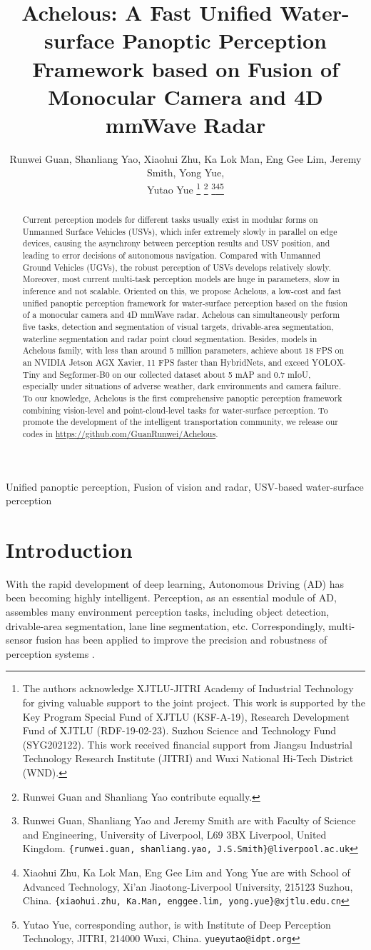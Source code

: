 \documentclass[letterpaper, 10 pt, conference]{ieeeconf}
\title{Achelous: A Fast Unified Water-surface Panoptic Perception Framework based on Fusion of Monocular Camera and 4D mmWave Radar}
\author{Runwei Guan, Shanliang Yao, Xiaohui Zhu, Ka Lok Man, Eng Gee Lim, Jeremy Smith,  Yong Yue, \\ Yutao Yue
\thanks{The authors acknowledge XJTLU-JITRI Academy of Industrial Technology for giving valuable support to the joint project. This work is supported by the Key Program Special Fund of XJTLU (KSF-A-19), Research Development Fund of XJTLU (RDF-19-02-23). Suzhou Science and Technology Fund (SYG202122). This work received financial support from Jiangsu Industrial Technology Research Institute (JITRI) and Wuxi National Hi-Tech District (WND).}
\thanks{Runwei Guan and Shanliang Yao contribute equally.}
\thanks{Runwei Guan, Shanliang Yao and Jeremy Smith are with Faculty of Science and Engineering,
        University of Liverpool, L69 3BX Liverpool, United Kingdom. 
        {\tt\small \{runwei.guan, shanliang.yao, J.S.Smith\}@liverpool.ac.uk}}\thanks{Xiaohui Zhu, Ka Lok Man, Eng Gee Lim and Yong Yue are with School of Advanced Technology, Xi'an Jiaotong-Liverpool University, 215123 Suzhou, China.  
        {\tt\small \{xiaohui.zhu, Ka.Man, enggee.lim, yong.yue\}@xjtlu.edu.cn}}\thanks{Yutao Yue, corresponding author, is with Institute of Deep Perception Technology, JITRI, 214000 Wuxi, China.  
        {\tt\small yueyutao@idpt.org}}}
\begin{document}
\maketitle
\thispagestyle{empty}
\pagestyle{empty}


\begin{abstract}
Current perception models for different tasks usually exist in modular forms on Unmanned Surface Vehicles (USVs), which infer extremely slowly in parallel on edge devices, causing the asynchrony between perception results and USV position, and leading to error decisions of autonomous navigation. Compared with Unmanned Ground Vehicles (UGVs), the robust perception of USVs develops relatively slowly. Moreover, most current multi-task perception models are huge in parameters, slow in inference and not scalable. Oriented on this, we propose Achelous, a low-cost and fast unified panoptic perception framework for water-surface perception based on the fusion of a monocular camera and 4D mmWave radar. Achelous can simultaneously perform five tasks, detection and segmentation of visual targets, drivable-area segmentation, waterline segmentation and radar point cloud segmentation. Besides, models in Achelous family, with less than around 5 million parameters, achieve about 18 FPS on an NVIDIA Jetson AGX Xavier, 11 FPS faster than HybridNets, and exceed YOLOX-Tiny and Segformer-B0 on our collected dataset about 5 mAP and 0.7 mIoU, especially under situations of adverse weather, dark environments and camera failure. To our knowledge, Achelous is the first comprehensive panoptic perception framework combining vision-level and point-cloud-level tasks for water-surface perception. To promote the development of the intelligent transportation community, we release our codes in \url{https://github.com/GuanRunwei/Achelous}.
\end{abstract}

\begin{keywords}
Unified panoptic perception, Fusion of vision and radar, USV-based water-surface perception
\end{keywords}

\section{Introduction}

With the rapid development of deep learning, Autonomous Driving (AD) has been becoming highly intelligent. Perception, as an essential module of AD, assembles many environment perception tasks, including object detection, drivable-area segmentation, lane line segmentation, etc. Correspondingly, multi-sensor fusion has been applied to improve the precision and robustness of perception systems \cite{bai2022transfusion}.
\end{document}
